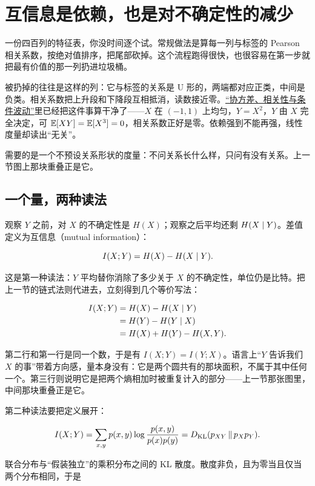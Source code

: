 \section{互信息是依赖，也是对不确定性的减少}
\label{sec:07-Information-Theory/02-Joint-Information/02}

一份四百列的特征表，你没时间逐个试。常规做法是算每一列与标签的 Pearson 相关系数，按绝对值排序，把尾部砍掉。这个流程跑得很快，也很容易在第一步就把最有价值的那一列扔进垃圾桶。

被扔掉的往往是这样的列：它与标签的关系是 U 形的，两端都对应正类，中间是负类。相关系数把上升段和下降段互相抵消，读数接近零。\hyperref[sec:05-Probability/04-Expectation-and-Moments/03]{``协方差、相关性与条件波动''}里已经把这件事算干净了——\(X\) 在 \((-1,1)\) 上均匀，\(Y=X^2\)，\(Y\) 由 \(X\) 完全决定，可 \(\mathbb{E}[XY]=\mathbb{E}[X^3]=0\)，相关系数正好是零。依赖强到不能再强，线性度量却读出``无关''。

需要的是一个不预设关系形状的度量：不问关系长什么样，只问有没有关系。上一节图上那块重叠正是它。

\subsection{一个量，两种读法}

观察 \(Y\) 之前，对 \(X\) 的不确定性是 \(H(X)\)；观察之后平均还剩 \(H(X\mid Y)\)。差值定义为互信息（mutual information）：

\[
I(X;Y)=H(X)-H(X\mid Y).
\]

这是第一种读法：\(Y\) 平均替你消除了多少关于 \(X\) 的不确定性，单位仍是比特。把上一节的链式法则代进去，立刻得到几个等价写法：

\[
\begin{aligned}
I(X;Y)&=H(X)-H(X\mid Y)\\
&=H(Y)-H(Y\mid X)\\
&=H(X)+H(Y)-H(X,Y).
\end{aligned}
\]

第二行和第一行是同一个数，于是有 \(I(X;Y)=I(Y;X)\)。语言上``\(Y\) 告诉我们 \(X\) 的事''带着方向感，量本身没有：它是两个圆共有的那块面积，不属于其中任何一个。第三行则说明它是把两个熵相加时被重复计入的部分——上一节那张图里，中间那块重叠正是它。

第二种读法要把定义展开：

\[
I(X;Y)=\sum_{x,y}p(x,y)\log\frac{p(x,y)}{p(x)p(y)}=D_{\mathrm{KL}}(p_{XY}\,\|\,p_Xp_Y).
\]

联合分布与``假装独立''的乘积分布之间的 KL 散度。散度非负，且为零当且仅当两个分布相同，于是


